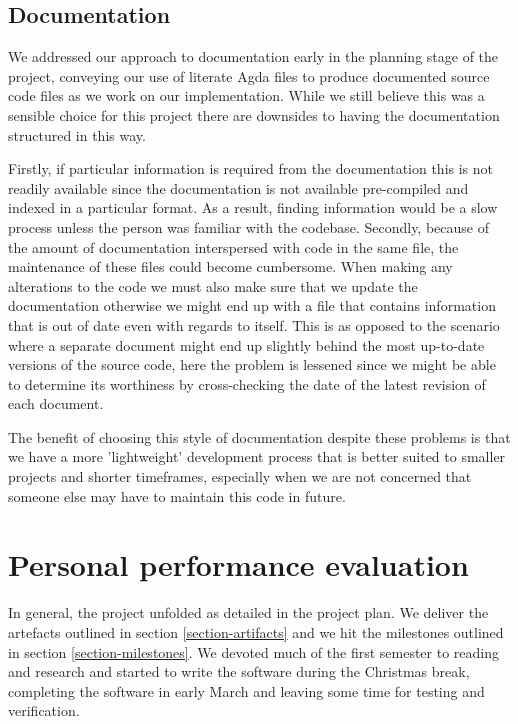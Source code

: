 \subsection{Documentation}

We addressed our approach to documentation early in the planning stage
of the project, conveying our use of literate Agda files to produce
documented source code files as we work on our implementation. While we
still believe this was a sensible choice for this project there are
downsides to having the documentation structured in this way.

Firstly, if particular information is required from the documentation
this is not readily available since the documentation is not available
pre-compiled and indexed in a particular format. As a result, finding
information would be a slow process unless the person was familiar
with the codebase. Secondly, because of the amount of documentation
interspersed with code in the same file, the maintenance of these
files could become cumbersome. When making any alterations to the code
we must also make sure that we update the documentation otherwise we
might end up with a file that contains information that is out of date
even with regards to itself. This is as opposed to the scenario where a
separate document might end up slightly behind the most up-to-date
versions of the source code, here the problem is lessened since we
might be able to determine its worthiness by cross-checking the date
of the latest revision of each document.

The benefit of choosing this style of documentation despite
these problems is that we have a more 'lightweight' development
process that is better suited to smaller projects and shorter
timeframes, especially when we are not concerned that someone else
may have to maintain this code in future.

\section{Personal performance evaluation}

In general, the project unfolded as detailed in the project plan. We
deliver the artefacts outlined in section \ref{section-artifacts} and we
hit the milestones outlined in section \ref{section-milestones}. We
devoted much of the first semester to reading and research and started
to write the software during the Christmas break, completing the
software in early March and leaving some time for testing and verification.

